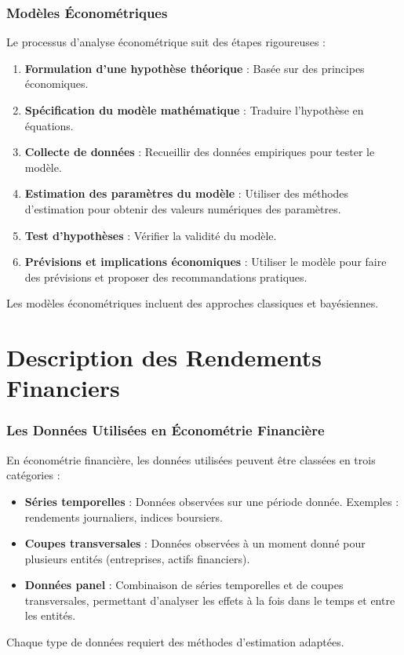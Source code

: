 \documentclass{beamer}
\begin{document}
\begin{frame}
  \frametitle{Modèles Économétriques}
  Le processus d'analyse économétrique suit des étapes rigoureuses :
  \begin{enumerate}
    \item \textbf{Formulation d'une hypothèse théorique} : Basée sur des principes économiques.
    \item \textbf{Spécification du modèle mathématique} : Traduire l'hypothèse en équations.
    \item \textbf{Collecte de données} : Recueillir des données empiriques pour tester le modèle.
    \item \textbf{Estimation des paramètres du modèle} : Utiliser des méthodes d'estimation pour obtenir des valeurs numériques des paramètres.
    \item \textbf{Test d'hypothèses} : Vérifier la validité du modèle.
    \item \textbf{Prévisions et implications économiques} : Utiliser le modèle pour faire des prévisions et proposer des recommandations pratiques.
  \end{enumerate}
  Les modèles économétriques incluent des approches classiques et bayésiennes.
\end{frame}

\section{Description des Rendements Financiers}

\begin{frame}
  \frametitle{Les Données Utilisées en Économétrie Financière}
  En économétrie financière, les données utilisées peuvent être classées en trois catégories :
  \begin{itemize}
    \item \textbf{Séries temporelles} : Données observées sur une période donnée. Exemples : rendements journaliers, indices boursiers.
    \item \textbf{Coupes transversales} : Données observées à un moment donné pour plusieurs entités (entreprises, actifs financiers).
    \item \textbf{Données panel} : Combinaison de séries temporelles et de coupes transversales, permettant d'analyser les effets à la fois dans le temps et entre les entités.
  \end{itemize}
  Chaque type de données requiert des méthodes d'estimation adaptées.
\end{frame}
\end{document}
